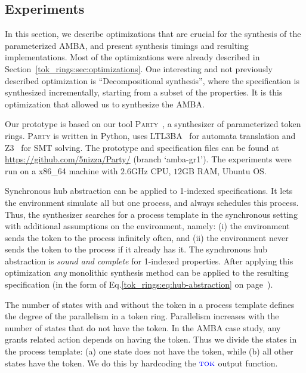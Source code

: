 \subsection{Experiments} \label{amba:sec:experiments}

  In this section,
  we describe optimizations that are crucial for the synthesis of the parameterized AMBA,
  and present synthesis timings and resulting implementations.
  Most of the optimizations were already described in Section~\ref{tok_rings:sec:optimizations}.
  One interesting and not previously described optimization is ``Decompositional synthesis'',
  where the specification is synthesized incrementally, starting from a subset of the properties.
  It is this optimization that allowed us to synthesize the AMBA.

  Our prototype is based on our tool \textsc{Party}~\cite{party},
  a synthesizer of parameterized token rings.
  \textsc{Party} is written in Python,
  uses LTL3BA~\cite{LTL3BA} for automata translation and Z3~\cite{Moura08} for SMT solving.
  The prototype and specification files can be found at \small{\url{https://github.com/5nizza/Party/}} (branch `amba-gr1').
  The experiments were run on a x86\_64 machine with $2.6$GHz CPU, $12$GB RAM, Ubuntu OS.

  Synchronous hub abstraction can be applied to 1-indexed specifications.
  It lets the environment simulate all but one process, and always schedules this process.
  Thus, the synthesizer searches for a process template in the synchronous setting
  with additional assumptions on the environment, namely: 
  (i) the environment sends the token to the process infinitely often, and
  (ii) the environment never sends the token to the process if it already has it.
  The synchronous hub abstraction is \emph{sound and complete} for 1-indexed properties.
  After applying this optimization \emph{any} monolithic synthesis method
  can be applied to the resulting specification
  (in the form of Eq.\ref{tok_rings:eq:hub-abstraction} on page~\pageref{tok_rings:eq:hub-abstraction}).

  The number of states with and without the token in a process template
  defines the degree of the parallelism in a token ring.
  Parallelism increases with the number of states that do not have the token.
  In the AMBA case study, any grants related action depends on having the token.
  Thus we divide the states in the process template:
  (a) one state does not have the token, while
  (b) all other states have the token.
  We do this by hardcoding the $\textsc{\textcolor{blue}{tok}}$ output function.

